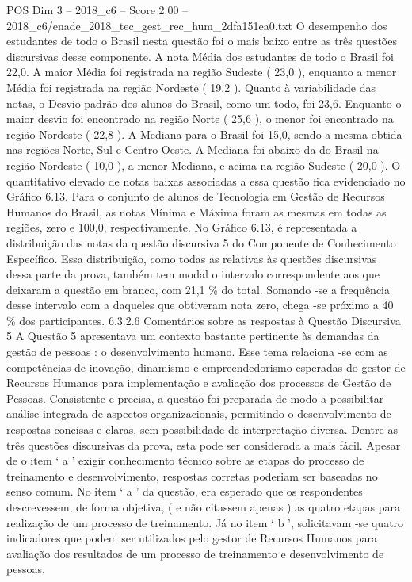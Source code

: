 \begin{textsample}{POS Dim 3 – 2018\_c6 – Score 2.00 – 2018\_c6/enade\_2018\_tec\_gest\_rec\_hum\_2dfa151ea0.txt}
O desempenho dos estudantes de todo o Brasil nesta questão foi o mais baixo entre as três questões discursivas desse componente.
A nota Média dos estudantes de todo o Brasil foi 22,0.
A maior Média foi registrada na região Sudeste ( 23,0 ), enquanto a menor Média foi registrada na região Nordeste ( 19,2 ).
Quanto à variabilidade das notas, o Desvio padrão dos alunos do Brasil, como um todo, foi 23,6.
Enquanto o maior desvio foi encontrado na região Norte ( 25,6 ), o menor foi encontrado na região Nordeste ( 22,8 ).
A Mediana para o Brasil foi 15,0, sendo a mesma obtida nas regiões Norte, Sul e Centro-Oeste.
A Mediana foi abaixo da do Brasil na região Nordeste ( 10,0 ), a menor Mediana, e acima na região Sudeste ( 20,0 ).
O quantitativo elevado de notas baixas associadas a essa questão fica evidenciado no Gráfico 6.13.
Para o conjunto de alunos de Tecnologia em Gestão de Recursos Humanos do Brasil, as notas Mínima e Máxima foram as mesmas em todas as regiões, zero e 100,0, respectivamente.
No Gráfico 6.13, é representada a distribuição das notas da questão discursiva 5 do Componente de Conhecimento Específico.
Essa distribuição, como todas as relativas às questões discursivas dessa parte da prova, também tem modal o intervalo correspondente aos que deixaram a questão em branco, com 21,1 \% do total.
Somando -se a frequência desse intervalo com a daqueles que obtiveram nota zero, chega -se próximo a 40 \% dos participantes. 6.3.2.6 Comentários sobre as respostas à Questão Discursiva 5 A Questão 5 apresentava um contexto bastante pertinente às demandas da gestão de pessoas : o desenvolvimento humano.
Esse tema relaciona -se com as competências de inovação, dinamismo e empreendedorismo esperadas do gestor de Recursos Humanos para implementação e avaliação dos processos de Gestão de Pessoas.
Consistente e precisa, a questão foi preparada de modo a possibilitar análise integrada de aspectos organizacionais, permitindo o desenvolvimento de respostas concisas e claras, sem possibilidade de interpretação diversa.
Dentre as três questões discursivas da prova, esta pode ser considerada a mais fácil.
Apesar de o item ‘ a ’ exigir conhecimento técnico sobre as etapas do processo de treinamento e desenvolvimento, respostas corretas poderiam ser baseadas no senso comum.
No item ‘ a ’ da questão, era esperado que os respondentes descrevessem, de forma objetiva, ( e não citassem apenas ) as quatro etapas para realização de um processo de treinamento.
Já no item ‘ b ’, solicitavam -se quatro indicadores que podem ser utilizados pelo gestor de Recursos Humanos para avaliação dos resultados de um processo de treinamento e desenvolvimento de pessoas.

\end{textsample}
